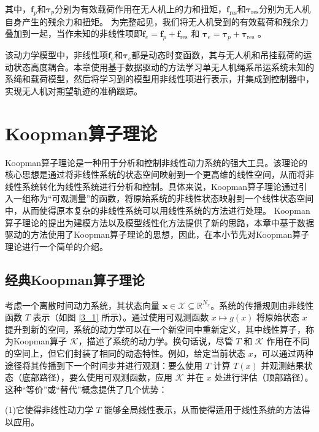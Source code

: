 \documentclass[lang=chs, degree=master, blindreview=false, winfonts=true]{yanputhesis}
\begin{document}
其中，$\bm{f}_p$和$\bm{\tau}_p$分别为有效载荷作用在无人机上的力和扭矩，$\bm{f}_\text{res}$和$\bm{\tau}_\text{res}$分别为无人机自身产生的残余力和扭矩。
为完整起见，我们将无人机受到的有效载荷和残余力叠加到一起，当作未知的非线性项即$\bm f_e = \bm f_p+ \bm f_{\text{res}}$ 和 $\bm \tau_e = \bm \tau_p+\bm \tau_{\text{res}}$ 。
	
该动力学模型中，非线性项$\bm f_e$和$\bm \tau_e$都是动态时变函数，其与无人机和吊挂载荷的运动状态高度耦合。本章使用基于数据驱动的方法学习单无人机绳系吊运系统未知的系绳和载荷模型，然后将学习到的模型用非线性项进行表示，并集成到控制器中，实现无人机对期望轨迹的准确跟踪。 




\section{Koopman算子理论}

Koopman算子理论是一种用于分析和控制非线性动力系统的强大工具\cite{1931Hamiltonian}。该理论的核心思想是通过将非线性系统的状态空间映射到一个更高维的线性空间，从而将非线性系统转化为线性系统进行分析和控制。具体来说，Koopman算子理论通过引入一组称为“可观测量”的函数，将原始系统的非线性状态映射到一个线性状态空间中，从而使得原本复杂的非线性系统可以用线性系统的方法进行处理。
Koopman算子理论的提出为建模方法以及模型线性化方法提供了新的思路，本章中基于数据驱动的方法使用了Koopman算子理论的思想，因此，在本小节先对Koopman算子理论进行一个简单的介绍。

\subsection{经典Koopman算子理论}

考虑一个离散时间动力系统，其状态向量 \( \bm x \in \mathcal{X} \subseteq \mathbb{R}^{N_x} \)。系统的传播规则由非线性函数 \( T \) 表示（如图 \ref{3_1} 所示）。通过使用可观测函数 \( x \mapsto g(x) \) 将原始状态 \( x \) 提升到新的空间，系统的动力学可以在一个新空间中重新定义，其中线性算子，称为Koopman算子 \( \mathcal{K} \)，描述了系统的动力学。换句话说，尽管 \( T \) 和 \( \mathcal{K} \) 作用在不同的空间上，但它们封装了相同的动态特性。例如，给定当前状态 \( x \)，可以通过两种途径将其传播到下一个时间步并进行观测：要么使用 \( T \) 计算 \( T(x) \) 并观测结果状态（底部路径），要么使用可观测函数，应用 \( \mathcal{K} \) 并在 \( x \) 处进行评估（顶部路径）。这种“等价”或“替代”概念提供了几个优势：

(1)它使得非线性动力学 \( T \) 能够全局线性表示，从而使得适用于线性系统的方法得以应用。
\end{document}
